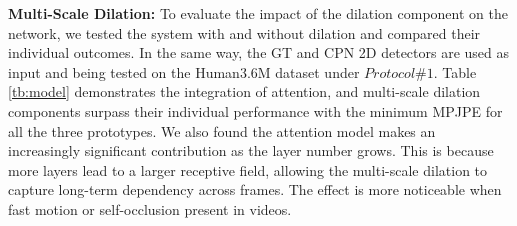\documentclass[twocolumn]{svjour3}          \smartqed  \usepackage{graphicx}
\begin{document}
{\bf Multi-Scale Dilation: } To evaluate the impact of the dilation component on the network,  we tested the system with and without dilation and compared their individual outcomes. In the same way, the GT and CPN  2D detectors are used as input and being tested on the Human3.6M dataset under $Protocol \#1$. Table \ref{tb:model} demonstrates the integration of attention, and multi-scale dilation components surpass their individual performance with the minimum MPJPE for all the three prototypes. We also found the attention model makes an increasingly significant contribution as the layer number grows. This is because more layers lead to a larger receptive field, allowing the multi-scale dilation to capture long-term dependency across frames. The effect is more noticeable when fast motion or self-occlusion present in videos. 

\begin{table}[ht]
    \begin{center}
    \end{center}
    \caption{Ablation study on different components in our method. The evaluation is performed on Human3.6M under $Protocol \#1$ with MPJPE (mm).}
    \label{tb:model}
\end{table}
\end{document}
